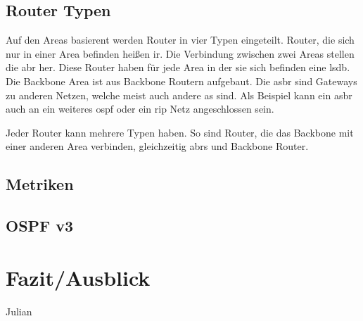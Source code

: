 \documentclass[11pt,a4paper,final]{article}
\begin{document}
\subsection{Router Typen}
Auf den Areas basierent werden Router in vier Typen eingeteilt.
Router, die sich nur in einer Area befinden heißen \ac{ir}.
Die Verbindung zwischen zwei Areas stellen die \ac{abr} her.
Diese Router haben für jede Area in der sie sich befinden eine \ac{lsdb}.
Die Backbone Area ist aus Backbone Routern aufgebaut.
Die \ac{asbr} sind Gateways zu anderen Netzen, welche meist auch andere \ac{as} sind.
Als Beispiel kann ein \ac{asbr} auch an ein weiteres \ac{ospf} oder ein \ac{rip} Netz angeschlossen sein.

Jeder Router kann mehrere Typen haben. So sind Router, die das Backbone mit einer anderen Area verbinden, gleichzeitig \ac{abr}s und Backbone Router.
\subsection{Metriken}
\subsection{OSPF v3}

\section{Fazit/Ausblick}
Julian

\clearpage
\nocite{*}
\printbibliography
\end{document}
